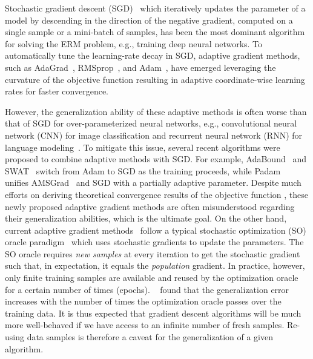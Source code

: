\documentclass[11pt]{article}
\begin{document}
Stochastic gradient descent (SGD)~\citep{romo51} which iteratively updates the parameter of a model by descending in the direction of the negative gradient, computed on a single sample or a mini-batch of samples, has been the most dominant algorithm for solving the ERM problem, e.g., training deep neural networks. 
To automatically tune the learning-rate decay in SGD, adaptive gradient methods, such as AdaGrad~\citep{duha11}, RMSprop~\citep{tige12}, and Adam~\citep{kiba15}, have emerged leveraging the curvature of the objective function resulting in adaptive coordinate-wise learning rates for faster convergence.

However, the generalization ability of these adaptive methods is often worse than that of SGD for over-parameterized neural networks, e.g., convolutional neural network (CNN) for image classification and recurrent neural network (RNN) for language modeling~\citep{wiro17}. 
To mitigate this issue, several recent algorithms were proposed to combine adaptive methods with SGD.
For example, AdaBound~\citep{luxi2019} and SWAT~\citep{keso2017} switch from Adam to SGD as the training proceeds, while Padam~\citep{chgu2018, zhta18} unifies AMSGrad~\citep{reka2018} and SGD with a partially adaptive parameter.  
Despite much efforts on deriving theoretical convergence results of the objective function \citep{zare18,wawu19, zosh2019, cheli2019}, these newly proposed adaptive gradient methods are often misunderstood regarding their generalization abilities, which is the ultimate goal.
On the other hand, current adaptive gradient methods~\citep{duha11,kiba15,tige12, reka2018, wawu19} follow a typical stochastic optimization (SO) oracle paradigm~\citep{romo51, ghla2013} which uses stochastic gradients to update the parameters. 
The SO oracle requires \emph{new samples} at every iteration to get the stochastic gradient such that, in expectation, it equals the \emph{population} gradient. 
In practice, however, only finite training samples are available and reused by the optimization oracle for a certain number of times (\ie epochs). 
~\citep{hare2016} found that the generalization error increases with the number of times the optimization oracle passes over the training data. 
It is thus expected that gradient descent algorithms will be much more well-behaved if we have access to an infinite number of fresh samples. 
Re-using data samples is therefore a caveat for the generalization of a given algorithm.
\end{document}
